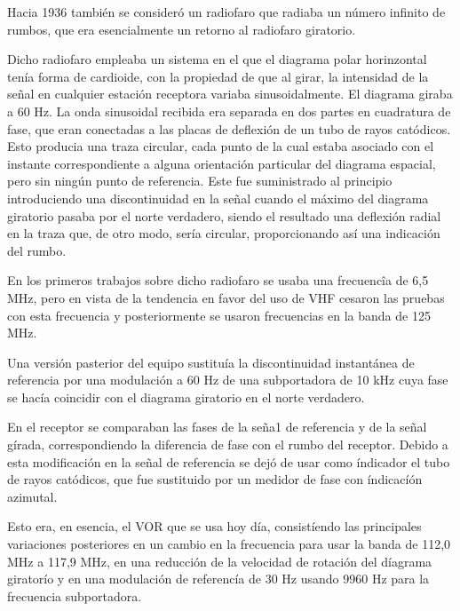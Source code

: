 Hacia 1936 tambi\'en se consideró un radiofaro que radiaba un n\'umero infinito de rumbos, que era esencialmente un retorno al radiofaro giratorio.

Dicho radiofaro empleaba un sistema en el que el diagrama polar horinzontal tenía forma de cardioide, con la propiedad de que al girar, la intensidad de la señal en cualquier estación receptora variaba sinusoidalmente. El diagrama giraba a 60 Hz. La onda sinusoidal recibida era separada en dos partes en cuadratura de fase, que eran conectadas a las placas
de deflexión de un tubo de rayos catódicos. Esto producia una traza
circular, cada punto de la cual estaba asociado con el instante correspondiente a 
alguna orientaci\'on particular del diagrama espacial, pero sin
ningún punto de referencia. Este fue suministrado al principio introduciendo una discontinuidad en la se\~nal cuando el m\'aximo del diagrama
giratorio pasaba por el norte verdadero, siendo el resultado una deflexi\'on radial en la traza que,
 de otro modo, sería circular, proporcionando así una indicación del rumbo. 

En los primeros trabajos sobre dicho radiofaro se usaba una frecuencîa de 6,5 MHz, 
pero en vista de la tendencia en favor del uso de VHF
cesaron las pruebas con esta frecuencia y posteriormente se usaron frecuencias en la banda de 125 MHz.

Una versi\'on pasterior del equipo sustituía la discontinuidad instantánea de referencia
 por una modulaci\'on a 60 Hz de una subportadora de 10 kHz cuya fase se hacía coincidir con el diagrama
 giratorio en el norte verdadero.

En el receptor se comparaban las fases de la se\~na1 de referencia y de
la se\~nal g\'irada, correspondiendo la diferencia de fase con el rumbo
del receptor. Debido a esta modificaci\'on en la se\~nal de referencia 
se dej\'o de usar como \'indicador el tubo de rayos catódicos, 
que fue sustituido
por un medidor de fase con \'indicac\'i\'on azimutal.

Esto era, en esencia, el VOR que se usa hoy día, consist\'iendo las
principales variaciones posteriores en un cambio en la frecuencia para
usar la banda de 112,0 MHz a 117,9 MHz, en una reducción de la velocidad 
de rotaci\'on del d\'iagrama girator\'io y en una modulación de referenc\'ia
 de 30 Hz usando 9960 Hz para la frecuencia subportadora.

